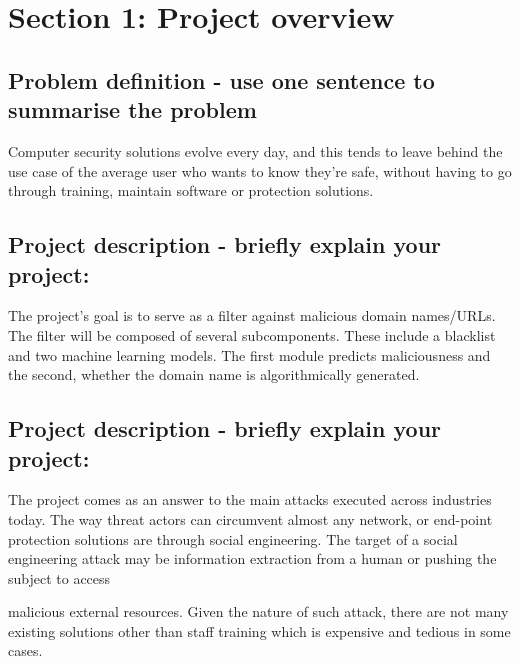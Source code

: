 \tocless\section{Section 1: Project overview}
\begin{mdframed}
	\tocless\subsection{Problem definition - use one sentence to summarise the problem}
	Computer security solutions evolve every day, and this tends to leave behind the use case of the average user who wants to know they’re safe, without having to go through training, maintain software or protection solutions.

	\tocless\subsection{Project description - briefly explain your project:}
	The project’s goal is to serve as a filter against malicious domain names/URLs. The filter will be composed of several subcomponents. These include a blacklist and two machine learning models. The first module predicts maliciousness and the second, whether the domain name is algorithmically generated.

	\tocless\subsection{Project description - briefly explain your project:}
	The project comes as an answer to the main attacks executed across industries today. The way threat actors can circumvent almost any network, or end-point protection solutions are through social engineering. The target of a social engineering attack may be information extraction from a human or pushing the subject to access \end{mdframed} \begin{mdframed} malicious external resources. Given the nature of such attack, there are not many existing solutions other than staff training which is expensive and tedious in some cases.


\end{mdframed}
